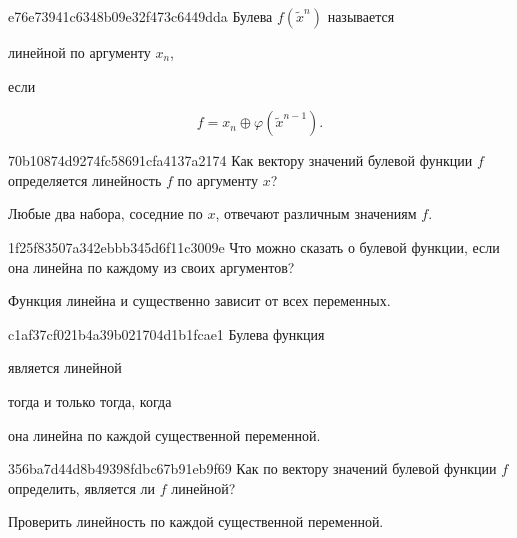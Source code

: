 \begin{note}{e76e73941c6348b09e32f473c6449dda}
    Булева \({ f(\widetilde x^{n}) }\) называется \begin{icloze}{2}линейной по аргументу \({ x_n }\),\end{icloze} если
    \begin{icloze}{1}
        \[
            f = x_n \oplus \varphi(\widetilde x^{n-1}).
        \]
    \end{icloze}
\end{note}

\begin{note}{70b10874d9274fc58691cfa4137a2174}
    Как вектору значений булевой функции \({ f }\) определяется линейность \({ f }\) по аргументу \({ x }\)?

    \begin{cloze}{1}
        Любые два набора, соседние по \({ x }\), отвечают различным значениям \({ f }\).
    \end{cloze}
\end{note}

\begin{note}{1f25f83507a342ebbb345d6f11c3009e}
    Что можно сказать о булевой функции, если она линейна по каждому из своих аргументов?

    \begin{cloze}{1}
        Функция линейна и существенно зависит от всех переменных.
    \end{cloze}
\end{note}

\begin{note}{c1af37cf021b4a39b021704d1b1fcae1}
    Булева функция \begin{icloze}{2}является линейной\end{icloze} \begin{icloze}{3}тогда и только тогда, когда\end{icloze} \begin{icloze}{1}она линейна по каждой существенной переменной.\end{icloze}
\end{note}

\begin{note}{356ba7d44d8b49398fdbc67b91eb9f69}
    Как по вектору значений булевой функции \({ f }\) определить, является ли \({ f }\) линейной?

    \begin{cloze}{1}
        Проверить линейность по каждой существенной переменной.
    \end{cloze}
\end{note}

